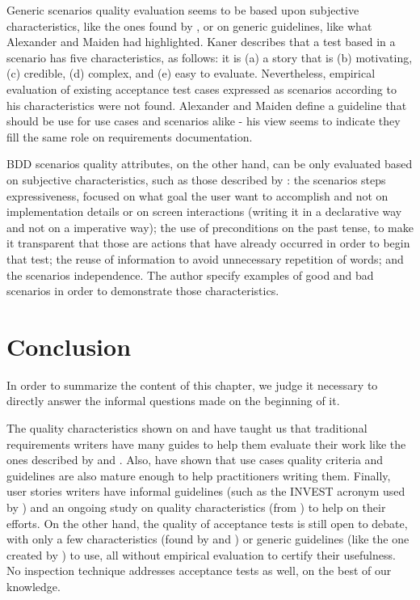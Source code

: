 Generic scenarios quality evaluation seems to be based upon subjective characteristics, like the ones found by \cite{Kaner_2003}, or on generic guidelines, like what Alexander and Maiden \cite{Alexander_2004} had highlighted. Kaner \cite{Kaner_2003} describes that a test based in a scenario has five characteristics, as follows: it is (a) a story that is (b) motivating, (c) credible, (d) complex, and (e) easy to evaluate. Nevertheless, empirical evaluation of existing acceptance test cases expressed as scenarios according to his characteristics were not found. Alexander and Maiden \cite{Alexander_2004} define a guideline that should be use for use cases and scenarios alike - his view seems to indicate they fill the same role on requirements documentation.  

BDD scenarios quality attributes, on the other hand, can be only evaluated based on subjective characteristics, such as those described by \cite{Smart_2014}: the scenarios steps expressiveness, focused on what goal the user want to accomplish and not on implementation details or on screen interactions (writing it in a declarative way and not on a imperative way); the use of preconditions on the past tense, to make it transparent that those are actions that have already occurred in order to begin that test; the reuse of information to avoid unnecessary repetition of words; and the scenarios independence. The author specify examples of good and bad scenarios in order to demonstrate those characteristics.

\section{Conclusion}

In order to summarize the content of this chapter, we judge it necessary to directly answer the informal questions made on the beginning of it. 

The quality characteristics shown on \cite{Babok_2009} and \cite{Babok_2015} have taught us that traditional requirements writers have many guides to help them evaluate their work like the ones described by \cite{Laitenberger_2002} and \cite{Melo_2001}. Also, \cite{Phalp_2011} have shown that use cases quality criteria and guidelines are also mature enough to help practitioners writing them. Finally, user stories writers have informal guidelines (such as the INVEST acronym used by \cite{Cohn_2004}) and an ongoing study on quality characteristics (from \cite{Lucassen_2015}) to help on their efforts. On the other hand, the quality of acceptance tests is still open to debate, with only a few characteristics (found by \cite{Kaner_2003} and \cite{Smart_2014}) or generic guidelines (like the one created by \cite{Alexander_2004}) to use, all without empirical evaluation to certify their usefulness. No inspection technique addresses acceptance tests as well, on the best of our knowledge.  

